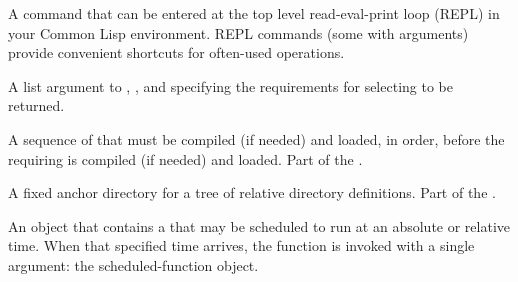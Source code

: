 \begin{glossary-list}

%
%
%
%
%
%
%
%
%
A  command that can be entered at the top level read-eval-print
loop (REPL) in your Common Lisp environment.  REPL commands (some with
arguments) provide convenient shortcuts for often-used operations.


%
%
%
%
%
%
%
A list argument to \textbf{},
\textbf{}, and
\textbf{} specifying the
 requirements for selecting  to
be returned.


%
%
%
%
A sequence of  that must be compiled (if needed) and loaded, in
order, before the requiring  is compiled (if needed) and loaded.
Part of the .


%
%
%
%
%
%
%
A fixed anchor directory for a tree of relative directory definitions.
Part of the .


%
%
%
%
An object that contains a  that may be scheduled to run at an
absolute or relative time. When that specified time arrives, the function
is invoked with a single argument: the scheduled-function object.


\end{glossary-list}
